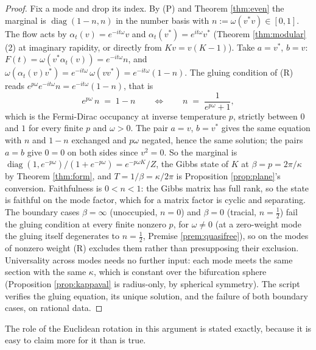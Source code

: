 \documentclass[11pt]{article}
\theoremstyle{definition}
\begin{document}
\begin{proof}
Fix a mode and drop its index. By (P) and Theorem \ref{thm:even} the marginal is $\operatorname{diag}(1 - n, n)$ in the number basis with $n := \omega(v^{*}v) \in [0,1]$. The flow acts by $\alpha_t(v) = e^{-it\omega}v$ and $\alpha_t(v^{*}) = e^{it\omega}v^{*}$ (Theorem \ref{thm:modular}(2) at imaginary rapidity, or directly from $Kv = v(K - 1)$). Take $a = v^{*}$, $b = v$: $F(t) = \omega(v^{*}\alpha_t(v)) = e^{-it\omega}n$, and $\omega(\alpha_t(v)v^{*}) = e^{-it\omega}\,\omega(vv^{*}) = e^{-it\omega}(1 - n)$. The gluing condition of (R) reads $e^{p\omega}e^{-it\omega}n = e^{-it\omega}(1 - n)$, that is
\[
e^{p\omega}\,n \;=\; 1 - n \qquad\Longleftrightarrow\qquad n \;=\; \frac{1}{e^{p\omega} + 1} ,
\]
which is the Fermi-Dirac occupancy at inverse temperature $p$, strictly between $0$ and $1$ for every finite $p$ and $\omega > 0$. The pair $a = v$, $b = v^{*}$ gives the same equation with $n$ and $1 - n$ exchanged and $p\omega$ negated, hence the same solution; the pairs $a = b$ give $0 = 0$ on both sides since $v^{2} = 0$. So the marginal is $\operatorname{diag}(1, e^{-p\omega})/(1 + e^{-p\omega}) = e^{-p\omega K}/Z$, the Gibbs state of $K$ at $\beta = p = 2\pi/\kappa$ by Theorem \ref{thm:form}, and $T = 1/\beta = \kappa/2\pi$ is Proposition \ref{prop:plane}'s conversion. Faithfulness is $0 < n < 1$: the Gibbs matrix has full rank, so the state is faithful on the mode factor, which for a matrix factor is cyclic and separating. The boundary cases $\beta = \infty$ (unoccupied, $n = 0$) and $\beta = 0$ (tracial, $n = \tfrac12$) fail the gluing condition at every finite nonzero $p$, for $\omega \neq 0$ (at a zero-weight mode the gluing itself degenerates to $n = \tfrac12$, Premise \ref{prem:quasifree}), so on the modes of nonzero weight (R) excludes them rather than presupposing their exclusion. Universality across modes needs no further input: each mode meets the same section with the same $\kappa$, which is constant over the bifurcation sphere (Proposition \ref{prop:kappaval} is radius-only, by spherical symmetry). The script verifies the gluing equation, its unique solution, and the failure of both boundary cases, on rational data.
\end{proof}

The role of the Euclidean rotation in this argument is stated exactly, because it is easy to claim more for it than is true.
\end{document}
